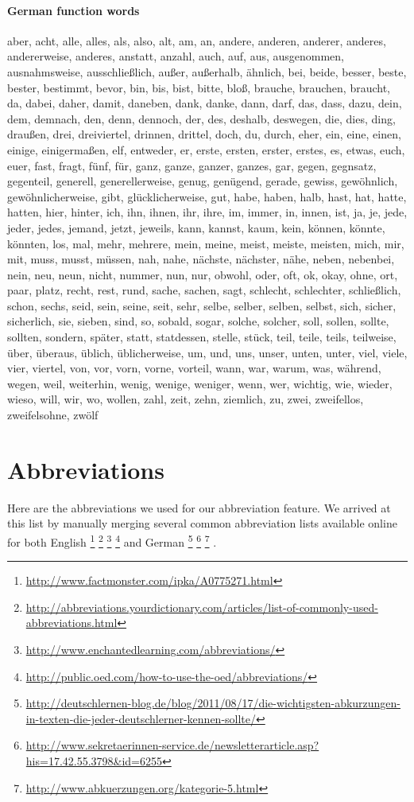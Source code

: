 \paragraph{German function words}
aber, acht, alle, alles, als, also, alt, am, an, andere, anderen, anderer, anderes, andererweise, anderes, anstatt, anzahl, auch, auf, aus, ausgenommen, ausnahmsweise, ausschließlich, außer, außerhalb, ähnlich, bei, beide, besser, beste, bester, bestimmt, bevor, bin, bis, bist, bitte, bloß, brauche, brauchen, braucht, da, dabei, daher, damit, daneben, dank, danke, dann, darf, das, dass, dazu, dein, dem, demnach, den, denn, dennoch, der, des, deshalb, deswegen, die, dies, ding, draußen, drei, dreiviertel, drinnen, drittel, doch, du, durch, eher, ein, eine, einen, einige, einigermaßen, elf, entweder, er, erste, ersten, erster, erstes, es, etwas, euch, euer, fast, fragt, fünf, für, ganz, ganze, ganzer, ganzes, gar, gegen, gegnsatz, gegenteil, generell, generellerweise, genug, genügend, gerade, gewiss, gewöhnlich, gewöhnlicherweise, gibt, glücklicherweise, gut, habe, haben, halb, hast, hat, hatte, hatten, hier, hinter, ich, ihn, ihnen, ihr, ihre, im, immer, in, innen, ist, ja, je, jede, jeder, jedes, jemand, jetzt, jeweils, kann, kannst, kaum, kein, können, könnte, könnten, los, mal, mehr, mehrere, mein, meine, meist, meiste, meisten, mich, mir, mit, muss, musst, müssen, nah, nahe, nächste, nächster, nähe, neben, nebenbei, nein, neu, neun, nicht, nummer, nun, nur, obwohl, oder, oft, ok, okay, ohne, ort, paar, platz, recht, rest, rund, sache, sachen, sagt, schlecht, schlechter, schließlich, schon, sechs, seid, sein, seine, seit, sehr, selbe, selber, selben, selbst, sich, sicher, sicherlich, sie, sieben, sind, so, sobald, sogar, solche, solcher, soll, sollen, sollte, sollten, sondern, später, statt, statdessen, stelle, stück, teil, teile, teils, teilweise, über, überaus, üblich, üblicherweise, um, und, uns, unser, unten, unter, viel, viele, vier, viertel, von, vor, vorn, vorne, vorteil, wann, war, warum, was, während, wegen, weil, weiterhin, wenig, wenige, weniger, wenn, wer, wichtig, wie, wieder, wieso, will, wir, wo, wollen, zahl, zeit, zehn, ziemlich, zu, zwei, zweifellos, zweifelsohne, zwölf


\section{Abbreviations}
\label{sec:app_abbreviations}
Here are the abbreviations we used for our abbreviation feature. We arrived at this list by manually merging several common abbreviation lists available online for both English
\footnote{\url{http://www.factmonster.com/ipka/A0775271.html}} 
\footnote{\url{http://abbreviations.yourdictionary.com/articles/list-of-commonly-used-abbreviations.html}} 
\footnote{\url{http://www.enchantedlearning.com/abbreviations/}} 
\footnote{\url{http://public.oed.com/how-to-use-the-oed/abbreviations/}} 
and German
\footnote{\url{http://deutschlernen-blog.de/blog/2011/08/17/die-wichtigsten-abkurzungen-in-texten-die-jeder-deutschlerner-kennen-sollte/}}
\footnote{\url{http://www.sekretaerinnen-service.de/newsletterarticle.asp?his=17.42.55.3798&id=6255}}
\footnote{\url{http://www.abkuerzungen.org/kategorie-5.html}}
.


